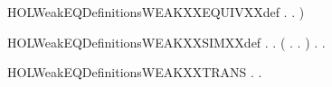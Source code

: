 \begin{SaveVerbatim}{HOLWeakEQDefinitionsWEAKXXEQUIVXXdef}
                \HOLSymConst{\HOLTokenForall{}}.
                     \HOLTokenTransBegin\HOLConst{\ensuremath{\tau}}\HOLTokenTransEnd {} \HOLSymConst{\HOLTokenImp{}}
                    \HOLSymConst{\HOLTokenExists{}}.    \HOLSymConst{\HOLTokenConj{}}   )
\end{SaveVerbatim}
\newcommand{\HOLWeakEQDefinitionsWEAKXXEQUIVXXdef}{\UseVerbatim{HOLWeakEQDefinitionsWEAKXXEQUIVXXdef}}
\begin{SaveVerbatim}{HOLWeakEQDefinitionsWEAKXXSIMXXdef}
\HOLTokenTurnstile{} \HOLSymConst{\HOLTokenForall{}}.
         \HOLSymConst{\HOLTokenEquiv{}}
       \HOLSymConst{\HOLTokenForall{}} .
              \HOLSymConst{\HOLTokenImp{}}
           (\HOLSymConst{\HOLTokenForall{}} .
                 \HOLTokenTransBegin{} \HOLTokenTransEnd {} \HOLSymConst{\HOLTokenImp{}} \HOLSymConst{\HOLTokenExists{}}.  \HOLTokenWeakTransBegin{} \HOLTokenWeakTransEnd {} \HOLSymConst{\HOLTokenConj{}}   ) \HOLSymConst{\HOLTokenConj{}}
           \HOLSymConst{\HOLTokenForall{}}.  \HOLTokenTransBegin\HOLConst{\ensuremath{\tau}}\HOLTokenTransEnd {} \HOLSymConst{\HOLTokenImp{}} \HOLSymConst{\HOLTokenExists{}}.    \HOLSymConst{\HOLTokenConj{}}   
\end{SaveVerbatim}
\newcommand{\HOLWeakEQDefinitionsWEAKXXSIMXXdef}{\UseVerbatim{HOLWeakEQDefinitionsWEAKXXSIMXXdef}}
\begin{SaveVerbatim}{HOLWeakEQDefinitionsWEAKXXTRANS}
\HOLTokenTurnstile{} \HOLSymConst{\HOLTokenForall{}}  .
        \HOLTokenWeakTransBegin{}\HOLTokenWeakTransEnd {} \HOLSymConst{\HOLTokenEquiv{}} \HOLSymConst{\HOLTokenExists{}} .    \HOLSymConst{\HOLTokenConj{}}  \HOLTokenTransBegin{}\HOLTokenTransEnd {} \HOLSymConst{\HOLTokenConj{}}   
\end{SaveVerbatim}
